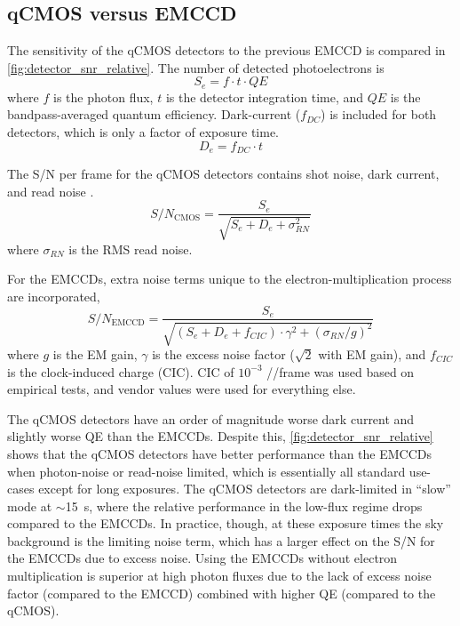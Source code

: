 \subsection{qCMOS versus EMCCD}

The sensitivity of the qCMOS detectors to the previous EMCCD is compared in \autoref{fig:detector_snr_relative}. The number of detected photoelectrons is
\begin{equation}
    S_e = f \cdot t \cdot QE
\end{equation}
where $f$ is the photon flux, $t$ is the detector integration time, and $QE$ is the bandpass-averaged quantum efficiency. Dark-current ($f_{DC}$) is included for both detectors, which is only a factor of exposure time.
\begin{equation}
    D_e = f_{DC} \cdot t
\end{equation}

The S/N per frame for the qCMOS detectors contains shot noise, dark current, and read noise \citep{janesick_photon_2007,stefanov_cmos_2022}.
\begin{equation}
    S/N_\mathrm{CMOS} = \frac{S_e}{\sqrt{S_e + D_e + \sigma_{RN}^2}}
\end{equation}
where $\sigma_{RN}$ is the RMS read noise.

For the EMCCDs, extra noise terms unique to the electron-multiplication process \citep{harpsoe_bayesian_2012} are incorporated,
\begin{equation}
    S/N_\mathrm{EMCCD} = \frac{S_e}{\sqrt{\left(S_e + D_e + f_{CIC}\right) \cdot \gamma^2 + \left(\sigma_{RN}/g\right)^2}}
\end{equation}
where $g$ is the EM gain, $\gamma$ is the excess noise factor ($\sqrt{2}$ with EM gain), and $f_{CIC}$ is the clock-induced charge (CIC). CIC of $10^{-3}$ \si{\electron/\pixel/frame} was used based on empirical tests, and vendor values were used for everything else.

The qCMOS detectors have an order of magnitude worse dark current and slightly worse QE than the EMCCDs. Despite this, \autoref{fig:detector_snr_relative} shows that the qCMOS detectors have better performance than the EMCCDs when photon-noise or read-noise limited, which is essentially all standard use-cases except for long exposures. The qCMOS detectors are dark-limited in ``slow'' mode at $\sim$\SI{15}{s}, where the relative performance in the low-flux regime drops compared to the EMCCDs. In practice, though, at these exposure times the sky background is the limiting noise term, which has a larger effect on the S/N for the EMCCDs due to excess noise. Using the EMCCDs without electron multiplication is superior at high photon fluxes due to the lack of excess noise factor (compared to the EMCCD) combined with higher QE (compared to the qCMOS).


